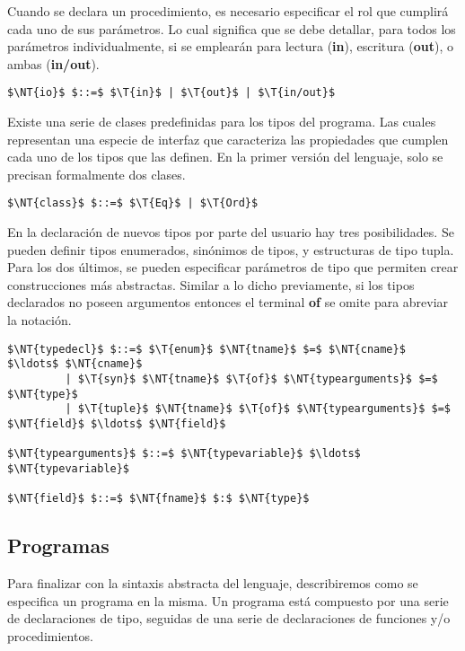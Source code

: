 Cuando se declara un procedimiento, es necesario especificar el rol que cumplirá cada uno de sus parámetros.
Lo cual significa que se debe detallar, para todos los parámetros individualmente, si se emplearán para lectura (\textbf{in}), escritura (\textbf{out}), o ambas (\textbf{in/out}).

\begin{lstlisting}[style = syntax]
$\NT{io}$ $::=$ $\T{in}$ | $\T{out}$ | $\T{in/out}$
\end{lstlisting}

Existe una serie de clases predefinidas para los tipos del programa.
Las cuales representan una especie de interfaz que caracteriza las propiedades que cumplen cada uno de los tipos que las definen.
En la primer versión del lenguaje, solo se precisan formalmente dos clases.

\begin{lstlisting}[style = syntax]
$\NT{class}$ $::=$ $\T{Eq}$ | $\T{Ord}$
\end{lstlisting}

En la declaración de nuevos tipos por parte del usuario hay tres posibilidades.
Se pueden definir tipos enumerados, sinónimos de tipos, y estructuras de tipo tupla.
Para los dos últimos, se pueden especificar parámetros de tipo que permiten crear construcciones más abstractas.
Similar a lo dicho previamente, si los tipos declarados no poseen argumentos entonces el terminal \textbf{of} se omite para abreviar la notación.

\begin{lstlisting}[style = syntax]
$\NT{typedecl}$ $::=$ $\T{enum}$ $\NT{tname}$ $=$ $\NT{cname}$ $\ldots$ $\NT{cname}$
         | $\T{syn}$ $\NT{tname}$ $\T{of}$ $\NT{typearguments}$ $=$ $\NT{type}$
         | $\T{tuple}$ $\NT{tname}$ $\T{of}$ $\NT{typearguments}$ $=$ $\NT{field}$ $\ldots$ $\NT{field}$

$\NT{typearguments}$ $::=$ $\NT{typevariable}$ $\ldots$ $\NT{typevariable}$

$\NT{field}$ $::=$ $\NT{fname}$ $:$ $\NT{type}$
\end{lstlisting}

\subsection{Programas}

Para finalizar con la sintaxis abstracta del lenguaje, describiremos como se especifica un programa en la misma.
Un programa está compuesto por una serie de declaraciones de tipo, seguidas de una serie de declaraciones de funciones y/o procedimientos.

